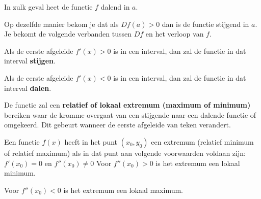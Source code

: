 \noindent In zulk geval heet de functie $f$ dalend in $a$.\vspace{5mm}

\noindent Op dezelfde manier bekom je dat als $Df(a)>0$ dan is de functie stijgend in $a$.
Je bekomt de volgende verbanden tussen $Df$ en het verloop van $f$.

\begin{eigenschap}
Als de eerste afgeleide $f'(x)>0$  is in een interval, dan zal de functie in dat interval \textbf{stijgen}.

Als de eerste afgeleide $f'(x)<0$ is in een interval, dan zal de functie in dat interval \textbf{dalen}.

De functie zal een \textbf{relatief of lokaal extremum (maximum of minimum)} bereiken waar de kromme overgaat van een stijgende naar een dalende functie of omgekeerd. Dit gebeurt wanneer de eerste afgeleide van teken verandert.

Een functie $f(x)$  heeft in het punt $(x_0,y_0)$ een extremum (relatief minimum of relatief maximum) als in dat punt aan volgende voorwaarden voldaan zijn:
$f'(x_0)=0$
en $f''(x_0)\ne 0$
Voor $f''(x_0)> 0$ is het extremum een lokaal minimum.

Voor $f''(x_0)< 0$ is het extremum een lokaal maximum.
\end{eigenschap}

